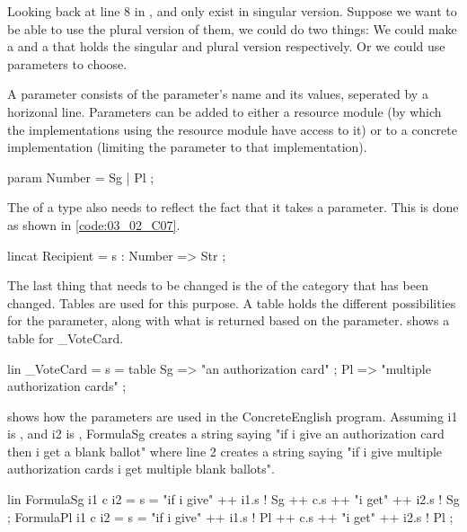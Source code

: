 Looking back at line 8 in ,  and  only exist in singular version. Suppose we want to be able to use the plural version of them, we could do two things: We could make a  and a  that holds the singular and plural version respectively. Or we could use parameters to choose.

A parameter consists of the parameter's name and its values, seperated by a horizonal line. Parameters can be added to either a resource module (by which the implementations using the resource module have access to it) or to a concrete implementation (limiting the parameter to that implementation).

\begin{lstgf}
param 
    Number = Sg | Pl ;
\end{lstgf}

The  of a type also needs to reflect the fact that it takes a parameter. This is done as shown in \ref{code:03_02_C07}.

\begin{lstgf}
lincat 
    Recipient = {s : Number => Str} ;
\end{lstgf}

The last thing that needs to be changed is the  of the category that has been changed. Tables are used for this purpose. A table holds the different possibilities for the parameter, along with what is returned based on the parameter.  shows a table for \_VoteCard.

\begin{lstgf}
lin 
    _VoteCard = {
        s = table {
            Sg => "an authorization card" ;
            Pl => "multiple authorization cards"
        }
    } ;
\end{lstgf}

 shows how the parameters are used in the ConcreteEnglish program. Assuming i1 is , and i2 is , FormulaSg creates a string saying "if i give an authorization card then i get a blank ballot" where line 2 creates a string saying "if i give multiple authorization cards i get multiple blank ballots".

\begin{lstgf}
lin
    FormulaSg i1 c i2 = {s = "if i give" ++ i1.s ! Sg ++ c.s ++ "i get" ++ i2.s ! Sg} ;
    FormulaPl i1 c i2 = {s = "if i give" ++ i1.s ! Pl ++ c.s ++ "i get" ++ i2.s ! Pl} ;
\end{lstgf}

